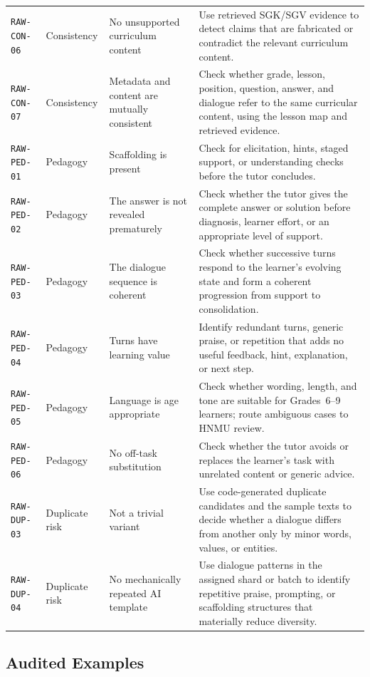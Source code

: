 \documentclass[conference]{IEEEtran}
\begin{document}
\begin{longtable}{P{0.11\textwidth}P{0.10\textwidth}P{0.22\textwidth}P{0.49\textwidth}}
\texttt{RAW-CON-06} & Consistency & No unsupported curriculum content &
Use retrieved SGK/SGV evidence to detect claims that are fabricated or
contradict the relevant curriculum content. \\
\texttt{RAW-CON-07} & Consistency & Metadata and content are mutually consistent &
Check whether grade, lesson, position, question, answer, and dialogue refer to
the same curricular content, using the lesson map and retrieved evidence. \\
\texttt{RAW-PED-01} & Pedagogy & Scaffolding is present &
Check for elicitation, hints, staged support, or understanding checks before
the tutor concludes. \\
\texttt{RAW-PED-02} & Pedagogy & The answer is not revealed prematurely &
Check whether the tutor gives the complete answer or solution before
diagnosis, learner effort, or an appropriate level of support. \\
\texttt{RAW-PED-03} & Pedagogy & The dialogue sequence is coherent &
Check whether successive turns respond to the learner's evolving state and
form a coherent progression from support to consolidation. \\
\texttt{RAW-PED-04} & Pedagogy & Turns have learning value &
Identify redundant turns, generic praise, or repetition that adds no useful
feedback, hint, explanation, or next step. \\
\texttt{RAW-PED-05} & Pedagogy & Language is age appropriate &
Check whether wording, length, and tone are suitable for Grades~6--9 learners;
route ambiguous cases to HNMU review. \\
\texttt{RAW-PED-06} & Pedagogy & No off-task substitution &
Check whether the tutor avoids or replaces the learner's task with unrelated
content or generic advice. \\
\texttt{RAW-DUP-03} & Duplicate risk & Not a trivial variant &
Use code-generated duplicate candidates and the sample texts to decide whether
a dialogue differs from another only by minor words, values, or entities. \\
\texttt{RAW-DUP-04} & Duplicate risk & No mechanically repeated AI template &
Use dialogue patterns in the assigned shard or batch to identify repetitive
praise, prompting, or scaffolding structures that materially reduce diversity. \\
\end{longtable}
\endgroup

\clearpage
\subsection{Audited Examples}
\end{document}
